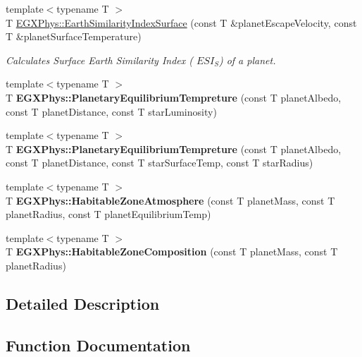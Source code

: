 \begin{DoxyCompactItemize}
{\footnotesize template$<$typename T $>$ }\\T \hyperlink{group___astrophysics_ga1df772b0ed354ca7f7e4a7a4af072325}{E\+G\+X\+Phys\+::\+Earth\+Similarity\+Index\+Surface} (const T \&planet\+Escape\+Velocity, const T \&planet\+Surface\+Temperature)
\begin{DoxyCompactList}\small\item\em Calculates Surface Earth Similarity Index ( $ESI_S$) of a planet. \end{DoxyCompactList}\item 
\mbox{\label{group___astrophysics_gaeac3ced5104701ee02fc100f7cf4c189}} 
{\footnotesize template$<$typename T $>$ }\\T {\bfseries E\+G\+X\+Phys\+::\+Planetary\+Equilibrium\+Tempreture} (const T planet\+Albedo, const T planet\+Distance, const T star\+Luminosity)
\item 
\mbox{\label{group___astrophysics_ga099c12876fba6deb13ae2cf0e92644fe}} 
{\footnotesize template$<$typename T $>$ }\\T {\bfseries E\+G\+X\+Phys\+::\+Planetary\+Equilibrium\+Tempreture} (const T planet\+Albedo, const T planet\+Distance, const T star\+Surface\+Temp, const T star\+Radius)
\item 
\mbox{\label{group___astrophysics_ga0814237dccfe3c968b97fa6c93aeca27}} 
{\footnotesize template$<$typename T $>$ }\\T {\bfseries E\+G\+X\+Phys\+::\+Habitable\+Zone\+Atmosphere} (const T planet\+Mass, const T planet\+Radius, const T planet\+Equilibrium\+Temp)
\item 
\mbox{\label{group___astrophysics_ga14ab036f8c617512236522c8e31dd072}} 
{\footnotesize template$<$typename T $>$ }\\T {\bfseries E\+G\+X\+Phys\+::\+Habitable\+Zone\+Composition} (const T planet\+Mass, const T planet\+Radius)
\end{DoxyCompactItemize}


\subsection{Detailed Description}


\subsection{Function Documentation}
\mbox{\label{group___astrophysics_ga909f82edfaed449b44e94788b642ebb8}} 
